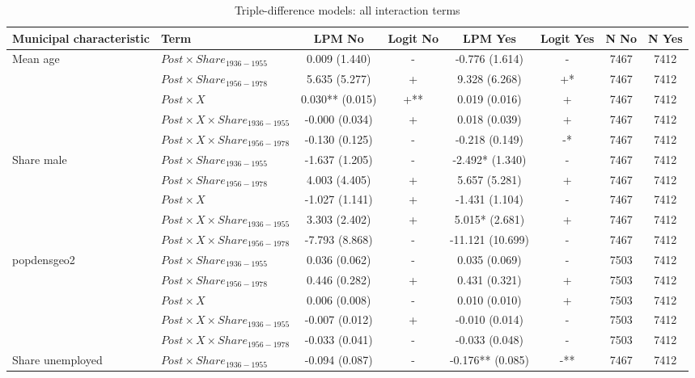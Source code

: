 \begin{table}[!htbp]
\centering
\caption{Triple-difference models: all interaction terms}
\label{tab:triple_all_interactions}
\scriptsize
\begin{tabular}{llcccccc}
\hline
Municipal characteristic & Term & LPM No & Logit No & LPM Yes & Logit Yes & N No & N Yes \\
\hline
Mean age & $Post \times Share_{1936-1955}$ & 0.009 (1.440) & - & -0.776 (1.614) & - & 7467 & 7412 \\
 & $Post \times Share_{1956-1978}$ & 5.635 (5.277) & + & 9.328 (6.268) & +* & 7467 & 7412 \\
 & $Post \times X$ & 0.030** (0.015) & +** & 0.019 (0.016) & + & 7467 & 7412 \\
 & $Post \times X \times Share_{1936-1955}$ & -0.000 (0.034) & + & 0.018 (0.039) & + & 7467 & 7412 \\
 & $Post \times X \times Share_{1956-1978}$ & -0.130 (0.125) & - & -0.218 (0.149) & -* & 7467 & 7412 \\
\addlinespace
Share male & $Post \times Share_{1936-1955}$ & -1.637 (1.205) & - & -2.492* (1.340) & - & 7467 & 7412 \\
 & $Post \times Share_{1956-1978}$ & 4.003 (4.405) & + & 5.657 (5.281) & + & 7467 & 7412 \\
 & $Post \times X$ & -1.027 (1.141) & + & -1.431 (1.104) & - & 7467 & 7412 \\
 & $Post \times X \times Share_{1936-1955}$ & 3.303 (2.402) & + & 5.015* (2.681) & + & 7467 & 7412 \\
 & $Post \times X \times Share_{1956-1978}$ & -7.793 (8.868) & - & -11.121 (10.699) & - & 7467 & 7412 \\
\addlinespace
popdensgeo2 & $Post \times Share_{1936-1955}$ & 0.036 (0.062) & - & 0.035 (0.069) & - & 7503 & 7412 \\
 & $Post \times Share_{1956-1978}$ & 0.446 (0.282) & + & 0.431 (0.321) & + & 7503 & 7412 \\
 & $Post \times X$ & 0.006 (0.008) & - & 0.010 (0.010) & + & 7503 & 7412 \\
 & $Post \times X \times Share_{1936-1955}$ & -0.007 (0.012) & + & -0.010 (0.014) & - & 7503 & 7412 \\
 & $Post \times X \times Share_{1956-1978}$ & -0.033 (0.041) & - & -0.033 (0.048) & - & 7503 & 7412 \\
\addlinespace
Share unemployed & $Post \times Share_{1936-1955}$ & -0.094 (0.087) & - & -0.176** (0.085) & -** & 7467 & 7412 \\

\end{tabular}
\end{table}
